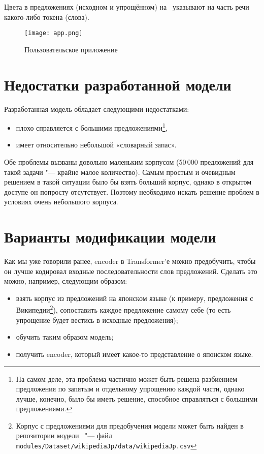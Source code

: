 Цвета в предложениях (исходном и упрощённом) на~ указывают на часть речи какого-либо токена (слова).

\begin{figure}[H]%
  \centering
  \texttt{[image: app.png]}
  \caption{Пользовательское приложение}
  \label{app-screen}
\end{figure}


\section{Недостатки разработанной модели}


Разработанная модель обладает следующими недостатками:
\begin{itemize}%
  \item плохо справляется с большими предложениями\footnote{На самом деле, эта проблема частично может быть решена разбиением предложения по запятым и отдельному упрощению каждой части, однако лучше, конечно, было бы иметь решение, способное справляться с большими предложениями.},
  \item имеет относительно небольшой «словарный запас».
\end{itemize}

Обе проблемы вызваны довольно маленьким корпусом (50\,000 предложений для такой задачи "--- крайне малое количество).
Самым простым и очевидным решением в такой ситуации было бы взять больший корпус, однако в открытом доступе он попросту отсутствует.
Поэтому необходимо искать решение проблем в условиях очень небольшого корпуса.


\section{Варианты модификации модели}


Как мы уже говорили ранее, encoder в Transformer'е можно предобучить, чтобы он лучше кодировал входные последовательности слов предложений.
Сделать это можно, например, следующим образом:
\begin{itemize}%
  \item взять корпус из предложений на японском языке (к примеру, предложения с Википедии\footnote{Корпус с предложениями для предобучения модели может быть найден в репозитории модели~\cite{ServerGithub} "--- файл \texttt{modules/Dataset/wikipediaJp/data/wikipediaJp.csv}}), сопоставить каждое предложение самому себе (то есть упрощение будет вестись в исходные предложения);
  \item обучить таким образом модель;
  \item получить encoder, который имеет какое-то представление о японском языке.
\end{itemize}

